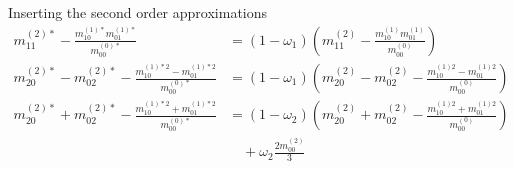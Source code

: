 Inserting the second order approximations
\begin{equation}
  \begin{aligned}
    m_{11}^{(2)*} - \frac{ m_{10}^{(1)*}m_{01}^{(1)*}}{m_{00}^{(0)*}} & = (1-\omega_1)\left(m_{11}^{(2)} - \frac{ m_{10}^{(1)}m_{01}^{(1)}}{m_{00}^{(0)}}\right) \\
    m_{20}^{(2)*}-m_{02}^{(2)*} - \frac{ m_{10}^{(1)*2} - m_{01}^{(1)*2}}{m_{00}^{(0)*}} & = (1-\omega_1) \left(m_{20}^{(2)}-m_{02}^{(2)} - \frac{ m_{10}^{(1)2} - m_{01}^{(1)2}}{m_{00}^{(0)}}\right) \\
    m_{20}^{(2)*}+m_{02}^{(2)*} - \frac{ m_{10}^{(1)*2} + m_{01}^{(1)*2}}{m_{00}^{(0)*}} & = (1-\omega_2)
    \left(m_{20}^{(2)}+m_{02}^{(2)} - \frac{ m_{10}^{(1)2} + m_{01}^{(1)2}}{m_{00}^{(0)}}\right)
    \\&\quad
    + \omega_2 \frac{2 m_{00}^{(2)}}{3} \\
  \end{aligned}
\end{equation}

